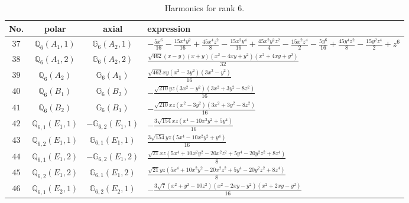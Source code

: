 \documentclass[fleqn,8pt,landscape]{jsarticle}
\begin{document}
\begin{table}[ht!]
\begin{center}
\caption{Harmonics for rank 6.}
\renewcommand{\arraystretch}{1.3}
\begin{tabular}{cccl} \hline \hline
No. & polar & axial & expression \\ \hline
$ 37 $ & $ \mathbb{Q}_{6}(A_{1},1) $ & $ \mathbb{G}_{6}(A_{2},1) $ & $ - \frac{5 x^{6}}{16} - \frac{15 x^{4} y^{2}}{16} + \frac{45 x^{4} z^{2}}{8} - \frac{15 x^{2} y^{4}}{16} + \frac{45 x^{2} y^{2} z^{2}}{4} - \frac{15 x^{2} z^{4}}{2} - \frac{5 y^{6}}{16} + \frac{45 y^{4} z^{2}}{8} - \frac{15 y^{2} z^{4}}{2} + z^{6} $ \\
$ 38 $ & $ \mathbb{Q}_{6}(A_{1},2) $ & $ \mathbb{G}_{6}(A_{2},2) $ & $ \frac{\sqrt{462} \left(x - y\right) \left(x + y\right) \left(x^{2} - 4 x y + y^{2}\right) \left(x^{2} + 4 x y + y^{2}\right)}{32} $ \\
$ 39 $ & $ \mathbb{Q}_{6}(A_{2}) $ & $ \mathbb{G}_{6}(A_{1}) $ & $ \frac{\sqrt{462} x y \left(x^{2} - 3 y^{2}\right) \left(3 x^{2} - y^{2}\right)}{16} $ \\
$ 40 $ & $ \mathbb{Q}_{6}(B_{1}) $ & $ \mathbb{G}_{6}(B_{2}) $ & $ - \frac{\sqrt{210} y z \left(3 x^{2} - y^{2}\right) \left(3 x^{2} + 3 y^{2} - 8 z^{2}\right)}{16} $ \\
$ 41 $ & $ \mathbb{Q}_{6}(B_{2}) $ & $ \mathbb{G}_{6}(B_{1}) $ & $ - \frac{\sqrt{210} x z \left(x^{2} - 3 y^{2}\right) \left(3 x^{2} + 3 y^{2} - 8 z^{2}\right)}{16} $ \\
$ 42 $ & $ \mathbb{Q}_{6,1}(E_{1},1) $ & $ -\mathbb{G}_{6,2}(E_{1},1) $ & $ - \frac{3 \sqrt{154} x z \left(x^{4} - 10 x^{2} y^{2} + 5 y^{4}\right)}{16} $ \\
$ 43 $ & $ \mathbb{Q}_{6,2}(E_{1},1) $ & $ \mathbb{G}_{6,1}(E_{1},1) $ & $ \frac{3 \sqrt{154} y z \left(5 x^{4} - 10 x^{2} y^{2} + y^{4}\right)}{16} $ \\
$ 44 $ & $ \mathbb{Q}_{6,1}(E_{1},2) $ & $ -\mathbb{G}_{6,2}(E_{1},2) $ & $ \frac{\sqrt{21} x z \left(5 x^{4} + 10 x^{2} y^{2} - 20 x^{2} z^{2} + 5 y^{4} - 20 y^{2} z^{2} + 8 z^{4}\right)}{8} $ \\
$ 45 $ & $ \mathbb{Q}_{6,2}(E_{1},2) $ & $ \mathbb{G}_{6,1}(E_{1},2) $ & $ \frac{\sqrt{21} y z \left(5 x^{4} + 10 x^{2} y^{2} - 20 x^{2} z^{2} + 5 y^{4} - 20 y^{2} z^{2} + 8 z^{4}\right)}{8} $ \\
$ 46 $ & $ \mathbb{Q}_{6,1}(E_{2},1) $ & $ \mathbb{G}_{6,2}(E_{2},1) $ & $ - \frac{3 \sqrt{7} \left(x^{2} + y^{2} - 10 z^{2}\right) \left(x^{2} - 2 x y - y^{2}\right) \left(x^{2} + 2 x y - y^{2}\right)}{16} $ \\

\end{tabular}
\end{center}
\end{table}
\end{document}
